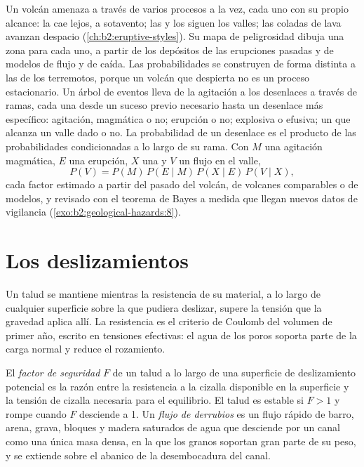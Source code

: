 Un volcán amenaza a través de varios procesos a la vez, cada uno con su propio alcance: la  cae lejos,
a sotavento; las  y los  siguen los valles; las coladas de lava avanzan despacio
(\cref{ch:b2:eruptive-styles}). Su mapa de peligrosidad dibuja una zona para cada uno, a partir de los depósitos de las
erupciones pasadas y de modelos de flujo y de caída. Las probabilidades se construyen de forma distinta a las de los
terremotos, porque un volcán que despierta no es un proceso estacionario. Un árbol de eventos lleva
de la agitación a los desenlaces a través de ramas, cada una desde un suceso previo necesario hasta un desenlace más
específico: agitación, magmática o no; erupción o no; explosiva o efusiva; un  que
alcanza un valle dado o no. La probabilidad de un desenlace es el producto de las probabilidades
condicionadas a lo largo de su rama. Con $M$ una agitación magmática, $E$ una erupción, $X$ una  y $V$ un flujo en el valle,
\begin{equation*}
P(V) = P(M) \, P(E \mid M) \, P(X \mid E) \, P(V \mid X),
\end{equation*}
cada factor estimado a partir del pasado del volcán, de volcanes comparables o de modelos, y revisado con
el teorema de Bayes a medida que llegan nuevos datos de vigilancia (\cref{exo:b2:geological-hazards:8}).

\section{Los deslizamientos}\label{sec:b2:geological-hazards:landslides}

Un talud se mantiene mientras la resistencia de su material, a lo largo de cualquier superficie sobre la que pudiera deslizar,
supere la tensión que la gravedad aplica allí. La resistencia es el criterio de Coulomb del volumen de
primer año, escrito en tensiones efectivas: el agua de los poros soporta parte de la carga normal y
reduce el rozamiento.

\begin{definition}\label{def:b2:geological-hazards:slope}
El \emph{factor de seguridad} $F$ de un talud a lo largo de una superficie de deslizamiento potencial
es la razón entre la resistencia a la cizalla disponible en la superficie y la tensión de cizalla necesaria para el
equilibrio. El talud es estable si $F > 1$ y rompe cuando $F$ desciende a 1. Un \emph{flujo de
derrubios} es un flujo rápido de barro, arena, grava, bloques y madera saturados de agua
que desciende por un canal como una única masa densa, en la que los granos soportan gran parte de su peso, y se extiende
sobre el abanico de la desembocadura del canal.
\end{definition}

